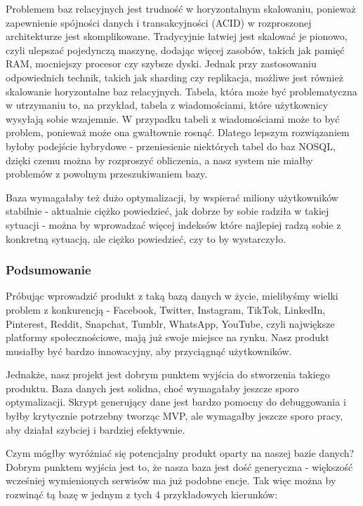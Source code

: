 \documentclass{article}
\begin{document}
Problemem baz relacyjnych jest trudność w horyzontalnym skalowaniu, ponieważ zapewnienie spójności danych i transakcyjności (ACID) w rozproszonej architekturze jest skomplikowane. Tradycyjnie łatwiej jest skalować je pionowo, czyli ulepszać pojedynczą maszynę, dodając więcej zasobów, takich jak pamięć RAM, mocniejszy procesor czy szybsze dyski. Jednak przy zastosowaniu odpowiednich technik, takich jak sharding czy replikacja, możliwe jest również skalowanie horyzontalne baz relacyjnych. Tabela, która może być problematyczna w utrzymaniu to, na przykład, tabela z wiadomościami, które użytkownicy wysyłają sobie wzajemnie.  W przypadku tabeli z wiadomościami może to być problem, ponieważ może ona gwałtownie rosnąć. Dlatego lepszym rozwiązaniem byłoby podejście hybrydowe - przeniesienie niektórych tabel do baz NOSQL, dzięki czemu można by rozproszyć obliczenia, a nasz system nie miałby problemów z powolnym przeszukiwaniem bazy.

Baza wymagałaby też dużo optymalizacji, by wspierać miliony użytkowników stabilnie - aktualnie ciężko powiedzieć, jak dobrze by sobie radziła w takiej sytuacji - można by wprowadzać więcej indeksów które najlepiej radzą sobie z konkretną sytuacją, ale ciężko powiedzieć, czy to by wystarczyło.

\subsubsection{Podsumowanie}

Próbując wprowadzić produkt z taką bazą danych w życie, mielibyśmy wielki problem z konkurencją - Facebook, Twitter, Instagram, TikTok, LinkedIn, Pinterest, Reddit, Snapchat, Tumblr, WhatsApp, YouTube, czyli największe platformy społecznościowe, mają już swoje miejsce na rynku. Nasz produkt musiałby być bardzo innowacyjny, aby przyciągnąć użytkowników.

Jednakże, nasz projekt jest dobrym punktem wyjścia do stworzenia takiego produktu. Baza danych jest solidna, choć wymagałaby jeszcze sporo optymalizacji. Skrypt generujący dane jest bardzo pomocny do debuggowania i byłby krytycznie potrzebny tworząc MVP, ale wymagałby jeszcze sporo pracy, aby działał szybciej i bardziej efektywnie.

Czym mógłby wyróżniać się potencjalny produkt oparty na naszej bazie danych? Dobrym punktem wyjścia jest to, że nasza baza jest dość generyczna - większość wcześniej wymienionych serwisów ma już podobne encje. Tak więc można by rozwinąć tą bazę w jednym z tych 4 przykładowych kierunków:
\end{document}
